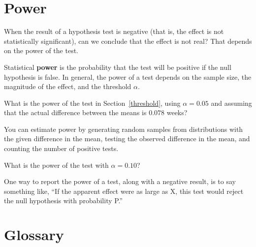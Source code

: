\documentclass[12pt]{book}
\begin{document}
\section{Power}

When the result of a hypothesis test is negative (that is, the effect is
not statistically significant), can we conclude that the effect is not
real?  That depends on the power of the test.

Statistical {\bf power} is the probability that the test will be
positive if the null hypothesis is false.  In general, the power of a
test depends on the sample size, the magnitude of the effect, and the
threshold $\alpha$.

\begin{ex}

What is the power of the test in Section~\ref{threshold}, using
$\alpha=0.05$ and assuming that the actual difference between the
means is $0.078$ weeks?

You can estimate power by generating random samples from distributions
with the given difference in the mean, testing the observed difference
in the mean, and counting the number of positive tests.

What is the power of the test with $\alpha=0.10$?

\end{ex}

One way to report the power of a test, along with a negative result,
is to say something like, ``If the apparent effect were as large
as X, this test would reject the null hypothesis with probability P.''















\section{Glossary}
\end{document}
